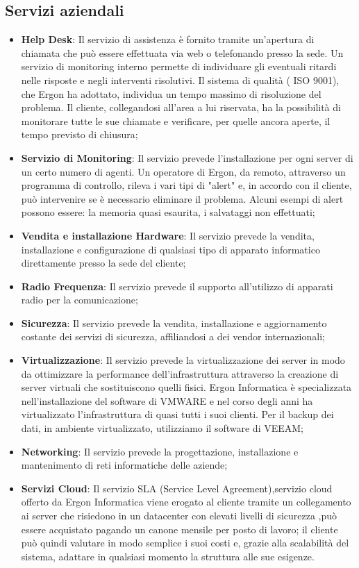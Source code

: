 \subsection{Servizi aziendali}
\begin{itemize}
	\item \textbf{Help Desk}: Il servizio di assistenza è fornito tramite un'apertura di chiamata che può essere effettuata via web o telefonando presso la sede.
	Un servizio di monitoring  interno permette di individuare gli eventuali ritardi nelle risposte e negli interventi risolutivi. Il sistema di qualità ( ISO 9001), che Ergon ha adottato, individua un tempo massimo di risoluzione del problema.
	Il cliente, collegandosi all'area a lui riservata, ha la possibilità di monitorare tutte le sue chiamate e verificare, per quelle ancora aperte,
	 il tempo  previsto di chiusura;
	\item \textbf{Servizio di Monitoring}: Il servizio prevede l'installazione per ogni server di un certo numero di agenti.
	Un operatore di Ergon, da remoto, attraverso un programma di controllo, rileva i vari tipi di "alert" e, in accordo con il cliente, 
	 può intervenire se è necessario eliminare il problema. Alcuni esempi di alert possono essere: la memoria quasi esaurita, i salvataggi non effettuati;
	\item \textbf{Vendita e installazione Hardware}: Il servizio prevede la vendita, installazione e configurazione di qualsiasi tipo di 
	apparato informatico direttamente presso la sede del cliente;
	\item \textbf{Radio Frequenza}: Il servizio prevede il supporto all'utilizzo di apparati radio per la comunicazione;
	\item \textbf{Sicurezza}: Il servizio prevede la vendita, installazione e aggiornamento costante dei servizi di sicurezza, affiliandosi a dei vendor internazionali;
	\item \textbf{Virtualizzazione}: Il servizio prevede la virtualizzazione dei server in modo da ottimizzare la performance dell'infrastruttura attraverso la creazione di server virtuali che sostituiscono quelli fisici. Ergon Informatica è specializzata nell'installazione del software di VMWARE e nel corso degli anni ha virtualizzato l'infrastruttura di quasi tutti i suoi clienti.
	Per il backup dei dati,  in ambiente virtualizzato, utilizziamo il software di VEEAM;
	\item \textbf{Networking}: Il servizio prevede la progettazione, installazione e mantenimento di reti informatiche delle aziende;
	\item \textbf{Servizi Cloud}: Il servizio SLA (Service Level Agreement),servizio cloud offerto da Ergon Informatica viene erogato al cliente tramite un collegamento ai server che risiedono in un datacenter con elevati livelli di sicurezza  ,può essere acquistato pagando un canone mensile per posto di lavoro; il cliente può quindi valutare in modo semplice i suoi costi e, grazie alla scalabilità del sistema, adattare in qualsiasi momento la struttura alle sue esigenze.
\end{itemize}

